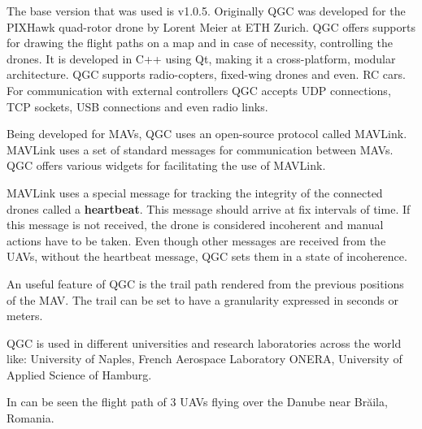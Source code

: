 The base version that was used is v1.0.5. Originally QGC was developed
for the PIXHawk quad-rotor drone by Lorent Meier at ETH Zurich. QGC offers supports
for drawing the flight paths on a map and in case of necessity,  
controlling the drones. It is developed in C++ using Qt, making it a cross-platform, 
modular architecture. QGC supports radio-copters, fixed-wing drones and even.
RC cars. For communication with external controllers QGC accepts UDP connections, 
TCP sockets, USB connections and even radio links.

Being developed for MAVs,  QGC uses
an open-source protocol called MAVLink. MAVLink uses a set of standard
messages for communication between MAVs. QGC offers various widgets for facilitating
the use of MAVLink.

MAVLink uses a special message for tracking the integrity of the connected drones
called a \textbf{heartbeat}. This message should arrive at fix intervals
of time. If this message is not received, the drone is considered incoherent
and manual actions have to be taken. Even though other messages are received from
the UAVs, without the heartbeat message, QGC sets them in a state of incoherence.

An useful feature of QGC is the trail path rendered from the previous positions
of the MAV. The trail can be set to have a granularity expressed in seconds or
meters.

QGC is used in different universities and research laboratories across the world 
like: University of Naples, French Aerospace Laboratory ONERA,  University of 
Applied Science of Hamburg.

In  can be seen the flight path of 3 UAVs flying
over the Danube near Brăila, Romania.

